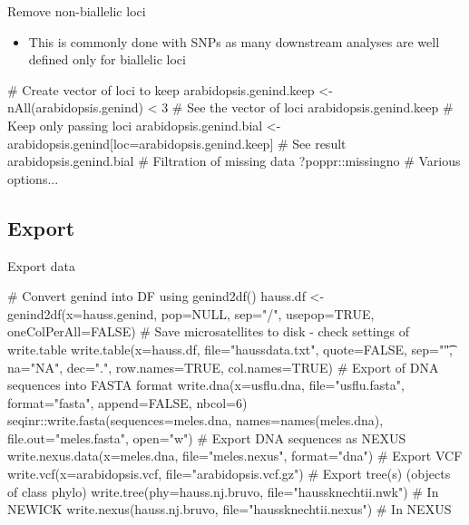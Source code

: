 \documentclass[compress, ucs, xelatex, 11pt, xcolor=svgnames,
	hyperref={
		bookmarks=true,
		unicode=true,
		colorlinks=true,
		pdftitle={Molecular data in R},
		plainpages=false,
		pdfauthor={Vojtech Zeisek},
		pdfsubject={Course about phylogeny and evolution in R},
		pdfcreator={XeLaTeX},
		pdfkeywords={R, evolution, phylogeny, molecular data},
		linkcolor=Tomato,
		anchorcolor=SaddleBrown,
		citecolor=Goldenrod,
		filecolor=DarkMagenta,
		menucolor=Sienna,
		urlcolor=DarkTurquoise,
		pdftex},
	url={hyphens, lowtilde} %
	]{beamer}
\begin{document}
\begin{frame}[fragile]{Remove non-biallelic loci}
	\begin{itemize}
		\item This is commonly done with SNPs as many downstream analyses are well defined only for biallelic loci
	\end{itemize}
	\begin{spluscode}
    # Create vector of loci to keep
    arabidopsis.genind.keep <- nAll(arabidopsis.genind) < 3
    # See the vector of loci
    arabidopsis.genind.keep
    # Keep only passing loci
    arabidopsis.genind.bial <-
      arabidopsis.genind[loc=arabidopsis.genind.keep]
    # See result
    arabidopsis.genind.bial
    # Filtration of missing data
    ?poppr::missingno # Various options...
	\end{spluscode}
\end{frame}

\subsection{Export}

\begin{frame}[fragile]{Export data}
	\begin{spluscode}
    # Convert genind into DF using genind2df()
    hauss.df <- genind2df(x=hauss.genind, pop=NULL, sep="/",
      usepop=TRUE, oneColPerAll=FALSE)
    # Save microsatellites to disk - check settings of write.table
    write.table(x=hauss.df, file="haussdata.txt", quote=FALSE,
      sep="\t", na="NA", dec=".", row.names=TRUE, col.names=TRUE)
    # Export of DNA sequences into FASTA format
    write.dna(x=usflu.dna, file="usflu.fasta", format="fasta",
      append=FALSE, nbcol=6)
    seqinr::write.fasta(sequences=meles.dna, names=names(meles.dna),
      file.out="meles.fasta", open="w")
    # Export DNA sequences as NEXUS
    write.nexus.data(x=meles.dna, file="meles.nexus", format="dna")
    # Export VCF
    write.vcf(x=arabidopsis.vcf, file="arabidopsis.vcf.gz")
    # Export tree(s) (objects of class phylo)
    write.tree(phy=hauss.nj.bruvo, file="haussknechtii.nwk") # In NEWICK
    write.nexus(hauss.nj.bruvo, file="haussknechtii.nexus") # In NEXUS
	\end{spluscode}
\end{frame}

\subsection{}
\end{document}
